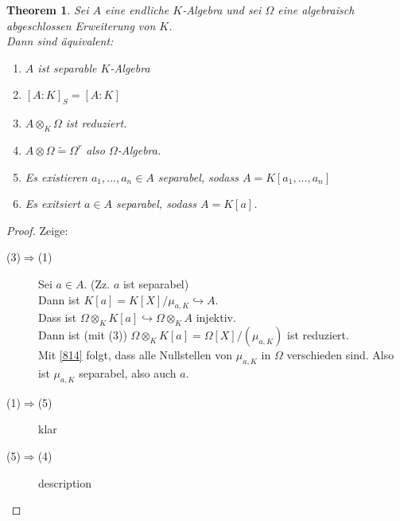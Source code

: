 \documentclass[10pt,a4paper]{article}
\newcommand{\isomorph}{\ensuremath{\tilde{=}}}
\newcounter{thm}[section]
\theoremstyle{definition}
\theoremstyle{plain}
\newtheorem{theorem}[thm]{Theorem}
\theoremstyle{remark}
\begin{document}
\begin{theorem}\label{925thm}
	Sei $A$ eine endliche $K$-Algebra und sei $\Omega$ eine algebraisch abgeschlossen Erweiterung von $K$.\\
	Dann sind äquivalent:
	\begin{enumerate}
		\item $A$ ist separable $K$-Algebra
		\item $[A:K]_S=[A:K]$
		\item $A\otimes_K\Omega$ ist reduziert.
		\item $A\otimes\Omega\isomorph \Omega^r$ also $\Omega$-Algebra.
		\item Es existieren $a_1,...,a_n\in A$ separabel, sodass $A=K[a_1,...,a_n]$
		\item Es exitsiert $a\in A$ separabel, sodass $A=K[a]$.
	\end{enumerate}
\end{theorem}
\begin{proof}
	Zeige:\\
	\begin{description}
		\item[(3)$\Rightarrow$(1)] Sei $a\in A$. (Zz. $a$ ist separabel)\\
		Dann ist $K[a]=K[X]/\mu_{a,K}\hookrightarrow A$.\\
		Dass ist $\Omega\otimes_K K[a]\hookrightarrow \Omega\otimes_K A$ injektiv.\\
		Dann ist (mit (3)) $\Omega\otimes_K K[a]=\Omega[X]/(\mu_{a,K})$ ist reduziert.\\
		Mit \ref{814} folgt, dass alle Nullstellen von $\mu_{a,K}$ in $\Omega$ verschieden sind. Also ist $\mu_{a,K}$ separabel, also auch $a$.
		\item[(1)$\Rightarrow$(5)] klar
		\item[(5)$\Rightarrow$(4)] description
	\end{description}
\end{proof}
\end{document}
